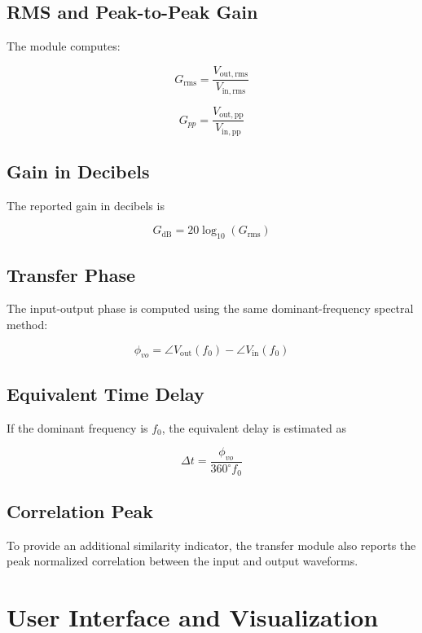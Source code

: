 \documentclass[conference]{IEEEtran}
\begin{document}
\subsection{RMS and Peak-to-Peak Gain}
The module computes:

\begin{equation}
G_{\mathrm{rms}} = \frac{V_{\mathrm{out,rms}}}{V_{\mathrm{in,rms}}}
\end{equation}

\begin{equation}
G_{pp} = \frac{V_{\mathrm{out,pp}}}{V_{\mathrm{in,pp}}}
\end{equation}

\subsection{Gain in Decibels}
The reported gain in decibels is

\begin{equation}
G_{\mathrm{dB}} = 20\log_{10}(G_{\mathrm{rms}})
\end{equation}

\subsection{Transfer Phase}
The input-output phase is computed using the same dominant-frequency spectral method:

\begin{equation}
\phi_{vo} = \angle V_{\mathrm{out}}(f_0) - \angle V_{\mathrm{in}}(f_0)
\end{equation}

\subsection{Equivalent Time Delay}
If the dominant frequency is $f_0$, the equivalent delay is estimated as

\begin{equation}
\Delta t = \frac{\phi_{vo}}{360^\circ f_0}
\end{equation}

\subsection{Correlation Peak}
To provide an additional similarity indicator, the transfer module also reports the peak normalized correlation between the input and output waveforms.

\section{User Interface and Visualization}
\end{document}
